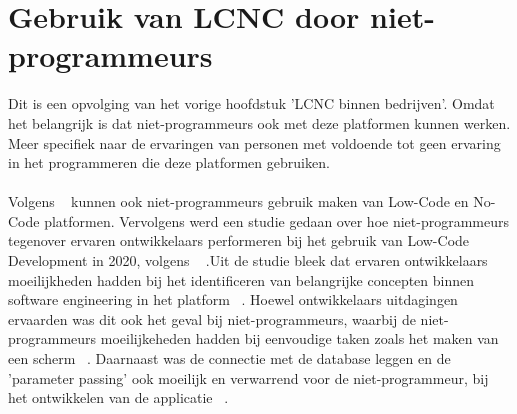 \section{Gebruik van LCNC door niet-programmeurs}
\label{sec:lcnc-niet-programmeurs}
Dit is een opvolging van het vorige hoofdstuk 'LCNC binnen bedrijven'. Omdat het belangrijk is dat niet-programmeurs ook met deze platformen kunnen werken.
Meer specifiek naar de ervaringen van personen met voldoende  tot geen ervaring in het programmeren die deze platformen gebruiken.
\\
\\
Volgens ~\textcite{Yan2021} kunnen ook niet-programmeurs gebruik maken van Low-Code en No-Code platformen.
Vervolgens werd een studie gedaan over hoe niet-programmeurs tegenover ervaren ontwikkelaars performeren bij het gebruik van Low-Code Development  in 2020, volgens ~\textcite{Hintsch2021} 
.Uit de studie bleek dat ervaren ontwikkelaars moeilijkheden hadden bij het identificeren van belangrijke concepten binnen software engineering in het platform ~\autocite{Hintsch2021}.
Hoewel ontwikkelaars uitdagingen ervaarden was dit ook het geval bij niet-programmeurs, waarbij de niet-programmeurs moeilijkeheden hadden bij eenvoudige taken zoals het maken van een scherm  ~\autocite{Hintsch2021}.
Daarnaast was de connectie met de database leggen en de 'parameter passing' ook moeilijk en verwarrend voor de niet-programmeur, bij het ontwikkelen van de applicatie  ~\autocite{Hintsch2021}.





